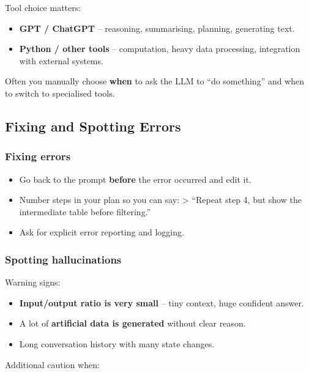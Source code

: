 \documentclass[
  letterpaper,
  DIV=11,
  numbers=noendperiod]{scrreprt}
\providecommand{\tightlist}{%
  \setlength{\itemsep}{0pt}\setlength{\parskip}{0pt}}
\begin{document}
Tool choice matters:

\begin{itemize}
\tightlist
\item
  \textbf{GPT / ChatGPT} -- reasoning, summarising, planning, generating
  text.
\item
  \textbf{Python / other tools} -- computation, heavy data processing,
  integration with external systems.
\end{itemize}

Often you manually choose \textbf{when} to ask the LLM to ``do
something'' and when to switch to specialised tools.

\subsection{Fixing and Spotting
Errors}\label{fixing-and-spotting-errors}

\subsubsection{Fixing errors}\label{fixing-errors}

\begin{itemize}
\tightlist
\item
  Go back to the prompt \textbf{before} the error occurred and edit it.
\item
  Number steps in your plan so you can say: \textgreater{} ``Repeat step
  4, but show the intermediate table before filtering.''
\item
  Ask for explicit error reporting and logging.
\end{itemize}

\subsubsection{Spotting hallucinations}\label{spotting-hallucinations}

Warning signs:

\begin{itemize}
\tightlist
\item
  \textbf{Input/output ratio is very small} -- tiny context, huge
  confident answer.
\item
  A lot of \textbf{artificial data is generated} without clear reason.
\item
  Long conversation history with many state changes.
\end{itemize}

Additional caution when:
\end{document}
